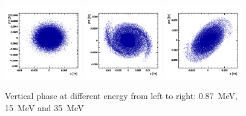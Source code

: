 \begin{figure}[tb]
\centering
    \includegraphics[width=0.3\textwidth]{figures/cyclotron/Inj2-z-pz-step-870KeV.png}
    \includegraphics[width=0.3\textwidth]{figures/cyclotron/Inj2-z-pz-step-15MeV.png}
    \includegraphics[width=0.3\textwidth]{figures/cyclotron/Inj2-z-pz-step-30MeV.png}
    \caption{Vertical phase at different energy from left to right: \SI{0.87}{\mega\electronvolt}, \SI{15}{\mega\electronvolt} and \SI{35}{\mega\electronvolt}}
    \label{fig:cyclphasespace}
\end{figure}



